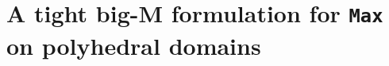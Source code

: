 \documentclass[smallextended]{svjour3}
\newcommand{\bbR}{\mathbb{R}}
\newcommand{\gr}{\operatorname{gr}}
\newcommand{\supp}{\operatorname{supp}}
\newcommand{\Max}{\texttt{Max}}
\newcommand{\ubar}[1]{\underline{#1}}
\renewcommand{\bar}[1]{\overline{#1}}
\begin{document}



\section{A tight big-M formulation for \Max{} on polyhedral domains}\label{app:max_big_m}

\end{document}
